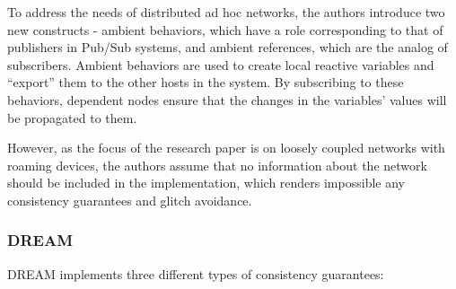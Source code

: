 \documentclass{sigplanconf}
\begin{document}
To address the needs of distributed ad hoc networks, the authors introduce two new constructs - ambient behaviors, which have a role corresponding to that of publishers in Pub/Sub systems, and ambient references, which are the analog of subscribers. Ambient behaviors are used to create local reactive variables and ``export'' them to the other hosts in the system. By subscribing to these behaviors, dependent nodes ensure that the changes in the variables' values will be propagated to them.

However, as the focus of the research paper is on loosely coupled networks with roaming devices, the authors assume that no information about the network should be included in the implementation, which renders impossible any consistency guarantees and glitch avoidance.

\subsubsection{DREAM}
DREAM \cite{dream} implements three different types of consistency guarantees:
\end{document}
